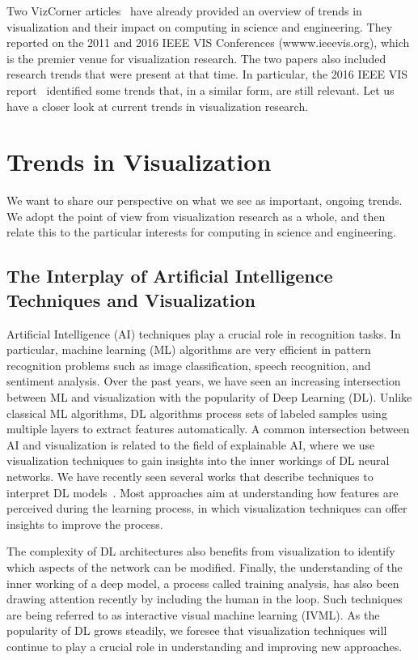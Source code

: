 \documentclass[10pt,journal,compsoc]{IEEEtran}
\begin{document}
{Two VizCorner articles~\cite{Scheidegger2011,Comba2017} have already provided an overview of trends in visualization and their impact on computing in science and engineering. They reported on the 2011 and 2016 IEEE VIS Conferences (wwww.ieeevis.org), which is the premier venue for visualization research. The two papers also included research trends that were present at that time. In particular, the 2016 IEEE VIS report~\cite{Comba2017} identified some trends that, in a similar form, are still relevant. Let us have a closer look at current trends in visualization research.


\section{Trends in Visualization}

We want to share our perspective on what we see as important, ongoing trends. We adopt the point of view from visualization research as a whole, and then relate this to the particular interests for computing in science and engineering.

\subsection{The Interplay of Artificial Intelligence Techniques and Visualization}

Artificial Intelligence (AI) techniques play a crucial role in recognition tasks. In particular, machine learning (ML) algorithms are very efficient in pattern recognition problems such as image classification, speech recognition, and sentiment analysis. Over the past years, we have seen an increasing intersection between ML and visualization with the popularity of Deep Learning (DL). Unlike classical ML algorithms, DL algorithms process sets of labeled samples using multiple layers to extract features automatically.
A common intersection between AI and visualization is related to the field of explainable AI, where we use visualization techniques to gain insights into the inner workings of DL neural networks. We have recently seen several works that describe techniques to interpret DL models~\cite{hohman2018visual,GARCIA2018}. Most approaches aim at understanding how features are perceived during the learning process, in which visualization techniques can offer insights to improve the process.

The complexity of DL architectures also benefits from visualization to identify which aspects of the network can be modified. Finally, the understanding of the inner working of a deep model, a process called training analysis, has also been drawing attention recently by including the human in the loop. Such techniques are being referred to as interactive visual machine learning (IVML). As the popularity of DL grows steadily, we foresee that visualization techniques will continue to play a crucial role in understanding and improving new approaches. 

}
\end{document}
